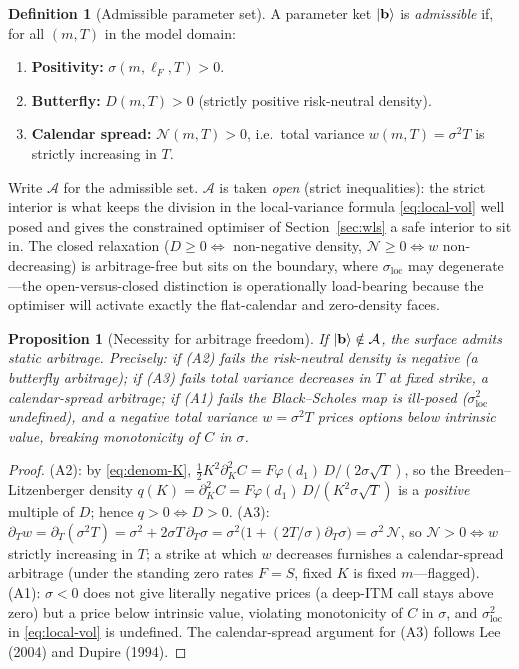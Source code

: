 \documentclass[11pt]{book}
\theoremstyle{plain}
\newtheorem{proposition}[theorem]{Proposition}
\theoremstyle{definition}
\newtheorem{definition}[theorem]{Definition}
\theoremstyle{remark}
\newcommand{\ket}[1]{\mathinner{\lvert #1 \rangle}}
\newcommand{\mln}{m}                             %
\newcommand{\lF}{\ell_F}                         %
\newcommand{\sloc}{\sigma_{\mathrm{loc}}}        %
\newcommand{\npdf}{\varphi}                      %
\begin{document}
\begin{definition}[Admissible parameter set]\label{def:admissible}
A parameter ket $\ket{\mathbf b}$ is \emph{admissible} if, for all $(\mln,T)$ in
the model domain:
\begin{enumerate}[label=\textup{(A\arabic*)}]
\item \textbf{Positivity:} $\sigma(\mln,\lF,T) > 0$.
\item \textbf{Butterfly:} $D(\mln,T) > 0$ (strictly positive risk-neutral
density).
\item \textbf{Calendar spread:} $\mathcal N(\mln,T) > 0$, i.e.\ total variance
$w(\mln,T) = \sigma^2 T$ is strictly increasing in $T$.
\end{enumerate}
Write $\mathcal A$ for the admissible set. $\mathcal A$ is taken \emph{open}
(strict inequalities): the strict interior is what keeps the division in the
local-variance formula \eqref{eq:local-vol} well posed and gives the constrained
optimiser of Section~\ref{sec:wls} a safe interior to sit in. The closed
relaxation ($D\ge0 \iff$ non-negative density, $\mathcal N\ge0 \iff w$
non-decreasing) is arbitrage-free but sits on the boundary, where $\sloc$ may
degenerate---the open-versus-closed distinction is operationally load-bearing
because the optimiser will activate exactly the flat-calendar and zero-density
faces.
\end{definition}

\begin{proposition}[Necessity for arbitrage freedom]\label{prop:no-arb}
If $\ket{\mathbf b}\notin\mathcal A$, the surface admits static arbitrage.
Precisely: if (A2) fails the risk-neutral density is negative (a butterfly
arbitrage); if (A3) fails total variance decreases in $T$ at fixed strike, a
calendar-spread arbitrage; if (A1) fails the Black--Scholes map is ill-posed
($\sloc^2$ undefined), and a negative total variance $w=\sigma^2 T$ prices
options below intrinsic value, breaking monotonicity of $C$ in $\sigma$.
\end{proposition}
\begin{proof}
(A2): by \eqref{eq:denom-K}, $\tfrac12 K^2\partial_K^2 C
= F\npdf(d_1)\,D/(2\sigma\sqrt T)$, so the Breeden--Litzenberger density
$q(K)=\partial_K^2 C = F\npdf(d_1)\,D/(K^2\sigma\sqrt T)$ is a \emph{positive}
multiple of $D$; hence $q>0 \iff D>0$. (A3): $\partial_T w
= \partial_T(\sigma^2 T) = \sigma^2 + 2\sigma T\,\partial_T\sigma
= \sigma^2\bigl(1+(2T/\sigma)\partial_T\sigma\bigr) = \sigma^2\,\mathcal N$, so
$\mathcal N>0 \iff w$ strictly increasing in $T$; a strike at which $w$ decreases
furnishes a calendar-spread arbitrage (under the standing zero rates $F=S$,
fixed $K$ is fixed $\mln$---flagged). (A1): $\sigma<0$ does not give literally
negative prices (a deep-ITM call stays above zero) but a price below intrinsic
value, violating monotonicity of $C$ in $\sigma$, and $\sloc^2$ in
\eqref{eq:local-vol} is undefined. The calendar-spread argument for (A3)
follows Lee (2004) and Dupire (1994).
\end{proof}
\end{document}
